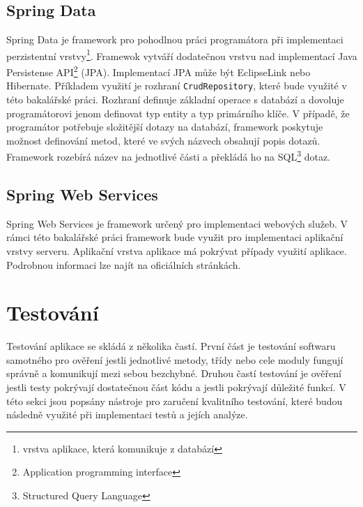     \subsection{Spring Data}
        Spring Data je framework pro pohodlnou práci programátora při implementaci perzistentní vrstvy\footnote{vrstva aplikace, která komunikuje z databází}. Framewok vytváří dodatečnou vrstvu nad implementací Java Persistense API\footnote{Application programming interface} (JPA). Implementací JPA může být EclipseLink nebo Hibernate. Příkladem využití je rozhraní \texttt{CrudRepository}, které bude využité v této bakalářské práci. Rozhraní definuje základní operace s databází a dovoluje programátorovi jenom definovat typ entity a typ primárního klíče. V případě, že programátor potřebuje složitější dotazy na databází, framework poskytuje možnost definování metod, které ve svých názvech obsahují popis dotazů\cite{query-methods}. Framework rozebírá název na jednotlivé části a překládá ho na SQL\footnote{Structured Query Language} dotaz.
    
    \subsection{Spring Web Services}
        Spring Web Services je framework určený pro implementaci webových služeb. V rámci této bakalářské práci framework bude využit pro implementaci aplikační vrstvy serveru. Aplikační vrstva aplikace má pokrývat případy využití aplikace. Podrobnou informaci lze najít na oficiálních stránkách\cite{spring-web-services}.
        

    
\section{Testování}\label{resere:testovani}
    Testování aplikace se skládá z několika častí. První část je testování softwaru samotného pro ověření jestli jednotlivé metody, třídy nebo cele moduly fungují správně a komunikují mezi sebou bezchybné. Druhou častí testování je ověření jestli testy pokrývají dostatečnou část kódu a jestli pokrývají důležité funkcí. V této sekci jsou popsány nástroje pro zaručení kvalitního testování, které budou následně využité při implementaci testů a jejích analýze.
    
